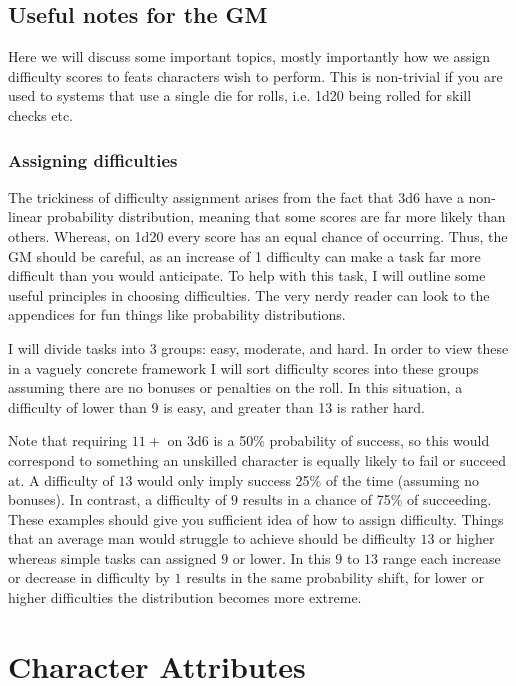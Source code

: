 \documentclass[a4paper,10pt,oneside]{book}
\begin{document}
\section{Useful notes for the GM}
Here we will discuss some important topics, mostly importantly how we assign difficulty scores to feats characters wish to perform. This is non-trivial if you are used to systems that use a single die for rolls, i.e. 1d20 being rolled for skill checks etc. 

\subsection{Assigning difficulties}
The trickiness of difficulty assignment arises from the fact that 3d6 have a non-linear probability distribution, meaning that some scores are far more likely than others. Whereas, on 1d20 every score has an equal chance of occurring. Thus, the GM should be careful, as an increase of 1 difficulty can make a task far more difficult than you would anticipate. To help with this task, I will outline some useful principles in choosing difficulties. The very nerdy reader can look to the appendices for fun things like probability distributions. 

I will divide tasks into 3 groups: easy, moderate, and hard. In order to view these in a vaguely concrete framework I will sort difficulty scores into these groups assuming there are no bonuses or penalties on the roll. In this situation, a difficulty of lower than 9 is easy, and greater than 13 is rather hard. 

Note that requiring $11+$ on 3d6 is a 50\% probability of success, so this would correspond to something an unskilled character is equally likely to fail or succeed at. A difficulty of $13$ would only imply success 25\% of the time (assuming no bonuses). In contrast, a difficulty of $9$ results in a chance of 75\% of succeeding. These examples should give you sufficient idea of how to assign difficulty. Things that an average man would struggle to achieve should be difficulty $13$ or higher whereas simple tasks can assigned $9$ or lower. In this $9$ to $13$ range each increase or decrease in difficulty by $1$ results in the same probability shift, for lower or higher difficulties the distribution becomes more extreme.




\chapter{Character Attributes}
\label{chap:attb}
\end{document}
